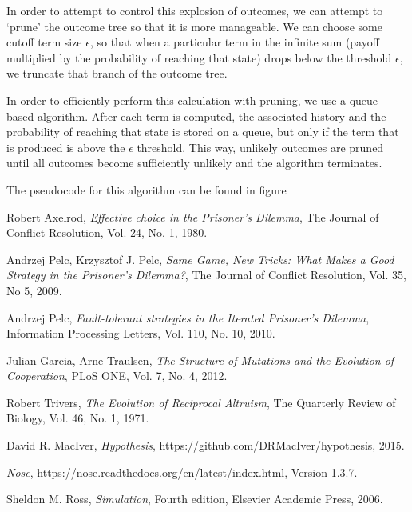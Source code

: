 \documentclass[a4paper,12pt]{article}
\begin{document}
In order to attempt to control this explosion of outcomes, we can attempt to `prune' the outcome tree so that it is more manageable.
We can choose some cutoff term size $\epsilon$, so that when a particular term in the infinite sum (payoff multiplied by the probability of reaching that state) drops below the threshold $\epsilon$, we truncate that branch of the outcome tree.

In order to efficiently perform this calculation with pruning, we use a queue based algorithm.
After each term is computed, the associated history and the probability of reaching that state is stored on a queue, but only if the term that is produced is above the $\epsilon$ threshold.
This way, unlikely outcomes are pruned until all outcomes become sufficiently unlikely and the algorithm terminates.

The pseudocode for this algorithm can be found in figure



\begin{thebibliography}{9}

        Robert Axelrod,
        \emph{Effective choice in the Prisoner's Dilemma},
        The Journal of Conflict Resolution,
        Vol. 24,
        No. 1,
        1980.

        Andrzej Pelc, Krzysztof J. Pelc,
        \emph{Same Game, New Tricks: What Makes a Good Strategy in the Prisoner's Dilemma?},
        The Journal of Conflict Resolution,
        Vol. 35,
        No 5,
        2009.

        Andrzej Pelc,
        \emph{Fault-tolerant strategies in the Iterated Prisoner's Dilemma},
        Information Processing Letters,
        Vol. 110,
        No. 10,
        2010.

        Julian Garcia, Arne Traulsen,
        \emph{The Structure of Mutations and the Evolution of Cooperation},
        PLoS ONE,
        Vol. 7,
        No. 4,
        2012.

        Robert Trivers,
        \emph{The Evolution of Reciprocal Altruism},
        The Quarterly Review of Biology,
        Vol. 46,
        No. 1,
        1971.

        David R. MacIver,
        \emph{Hypothesis},
        https://github.com/DRMacIver/hypothesis,
        2015.

        \emph{Nose},
        https://nose.readthedocs.org/en/latest/index.html,
        Version 1.3.7.


        Sheldon M. Ross,
        \emph{Simulation},
        Fourth edition,
        Elsevier Academic Press,
        2006.

\end{thebibliography}
\end{document}
